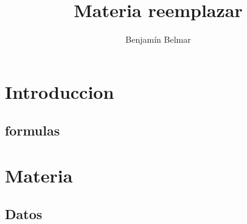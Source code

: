\documentclass[a4paper,11pt]{article}
\author{Benjamín Belmar}
\title{Materia reemplazar}
\date{}
\begin{document}
\maketitle

\newpage

\tableofcontents \newpage

\section{Introduccion}

\subsection{formulas}

\newpage

\section{Materia}

\subsection{Datos}
\end{document}
